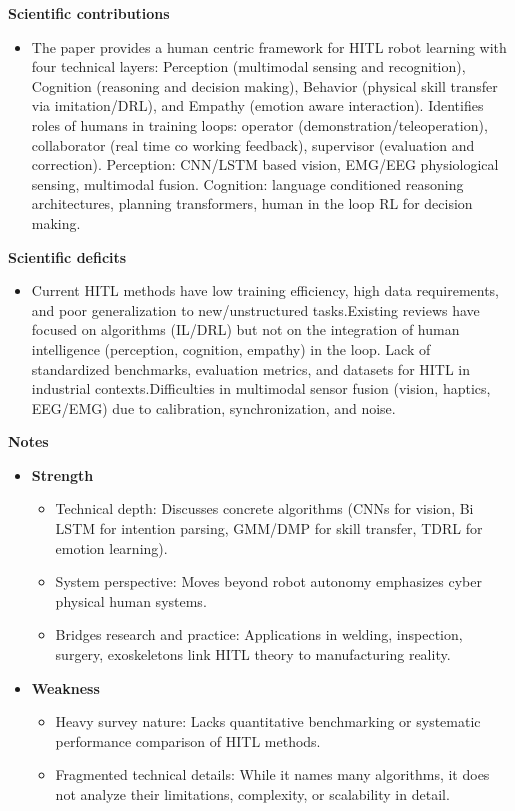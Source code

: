 \documentclass[report.tex]{subfiles}
\begin{document}
\noindent\textbf{Scientific contributions} 
\begin{itemize}
        \item  The paper provides a human centric framework for HITL robot learning with four technical layers: Perception (multimodal sensing and recognition), Cognition (reasoning and decision making), Behavior (physical skill transfer via imitation/DRL), and Empathy (emotion aware interaction). Identifies roles of humans in training loops: operator (demonstration/teleoperation), collaborator (real time co working feedback), supervisor (evaluation and correction). Perception: CNN/LSTM based vision, EMG/EEG physiological sensing, multimodal fusion. Cognition: language conditioned reasoning architectures, planning transformers, human in the loop RL for decision making.
        
\end{itemize}

\noindent\textbf{Scientific deficits} 
\begin{itemize}
        \item Current HITL methods have low training efficiency, high data requirements, and poor generalization to new/unstructured tasks.Existing reviews have focused on algorithms (IL/DRL) but not on the integration of human intelligence (perception, cognition, empathy) in the loop. Lack of standardized benchmarks, evaluation metrics, and datasets for HITL in industrial contexts.Difficulties in multimodal sensor fusion (vision, haptics, EEG/EMG) due to calibration, synchronization, and noise.
       
\end{itemize}

\noindent\textbf{Notes}
\begin{itemize}
    \item \noindent\textbf {Strength}
    \begin{itemize}
        \item Technical depth: Discusses concrete algorithms (CNNs for vision, Bi LSTM for intention parsing, GMM/DMP for skill transfer, TDRL for emotion learning).
        \item System perspective: Moves beyond robot autonomy   emphasizes cyber physical human systems.
        \item Bridges research and practice: Applications in welding, inspection, surgery, exoskeletons link HITL theory to manufacturing reality.
    \end{itemize}
    
    \item \noindent\textbf{Weakness}
    \begin{itemize}
        \item Heavy survey nature: Lacks quantitative benchmarking or systematic performance comparison of HITL methods.
        \item Fragmented technical details: While it names many algorithms, it does not analyze their limitations, complexity, or scalability in detail.
    \end{itemize}
\end{itemize}
\end{document}

